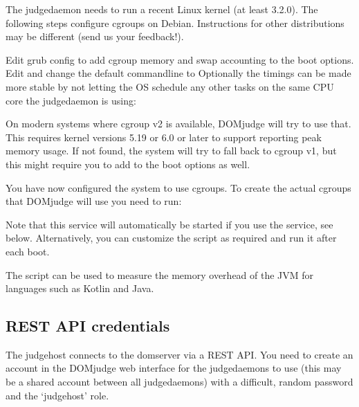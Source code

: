\documentclass[a4paper,10pt,english,openany]{sphinxmanual}
\begin{document}
\sphinxAtStartPar
The judgedaemon needs to run a recent Linux kernel (at least 3.2.0). The
following steps configure cgroups on Debian. Instructions for other
distributions may be different (send us your feedback!).

\sphinxAtStartPar
Edit grub config to add cgroup memory and swap accounting to the boot
options. Edit  and change the default
commandline to
Optionally the timings can be made more stable by not letting the OS schedule
any other tasks on the same CPU core the judgedaemon is using:

\sphinxAtStartPar
On modern systems where cgroup v2 is available, DOMjudge will try to
use that. This requires kernel versions 5.19 or 6.0 or later to
support reporting peak memory usage. If not found, the system will try
to fall back to cgroup v1, but this might require you to add
 to the boot options as well.

\sphinxAtStartPar
You have now configured the system to use cgroups. To create
the actual cgroups that DOMjudge will use you need to run:

\begin{sphinxVerbatim}[commandchars=\\\{\}]
    
\end{sphinxVerbatim}

\sphinxAtStartPar
Note that this service will automatically be started if you use the
 service, see below. Alternatively, you can
customize the script  as required and run it
after each boot.

\sphinxAtStartPar
The script  can be used to measure the memory overhead of the
JVM for languages such as Kotlin and Java.


\subsection{REST API credentials}
\label{\detokenize{install-judgehost:rest-api-credentials}}
\sphinxAtStartPar
The judgehost connects to the domserver via a REST API. You need to
create an account in the DOMjudge web interface for the judgedaemons
to use (this may be a shared account between all judgedaemons) with
a difficult, random password and the ‘judgehost’ role.
\end{document}
